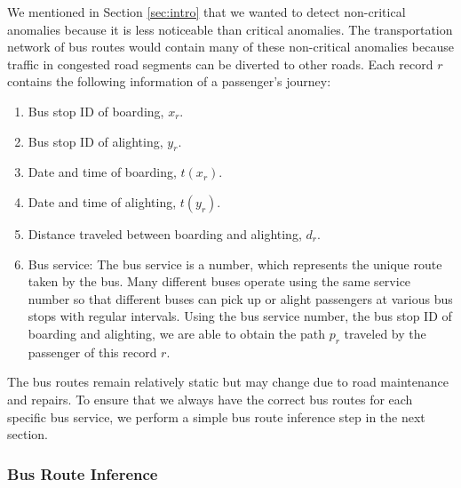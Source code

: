 \documentclass[conference]{IEEEtran.1.8}
\begin{document}
We mentioned in Section \ref{sec:intro} that we wanted to detect non-critical anomalies because it is less noticeable than critical anomalies. The transportation network of bus routes would contain many of these non-critical anomalies because traffic in congested road segments can be diverted to other roads. Each record $r$ contains the following information of a passenger's journey:
\begin{enumerate}
	\item Bus stop ID of boarding, $x_r$.
	\item Bus stop ID of alighting, $y_r$.
	\item Date and time of boarding, $t(x_r)$.
	\item Date and time of alighting, $t(y_r)$.
	\item Distance traveled between boarding and alighting, $d_r$.
	\item Bus service: The bus service is a number, which represents the unique route taken by the bus. Many different buses operate using the same service number so that different buses can pick up or alight passengers at various bus stops with regular intervals. Using the bus service number, the bus stop ID of boarding and alighting, we are able to obtain the path $p_r$ traveled by the passenger of this record $r$.
\end{enumerate}
The bus routes remain relatively static but may change due to road maintenance and repairs. To ensure that we always have the correct bus routes for each specific bus service, we perform a simple bus route inference step in the next section.

\subsubsection{Bus Route Inference}
\end{document}
